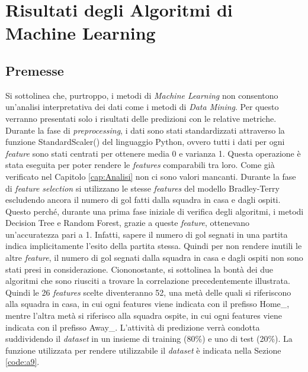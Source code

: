\chapter{Risultati degli Algoritmi di Machine Learning}
\label{cap:RisML}

\section{Premesse}
Si sottolinea che, purtroppo, i metodi di \emph{Machine Learning} non consentono un'analisi interpretativa dei dati come i metodi di \emph{Data Mining}. Per questo verranno presentati solo i risultati delle predizioni con le relative metriche.\\
Durante la fase di \emph{preprocessing}, i dati sono stati standardizzati attraverso la funzione \textsf{StandardScaler()} del linguaggio Python, ovvero tutti i dati per ogni \emph{feature} sono stati centrati per ottenere media 0 e varianza 1. Questa operazione è stata eseguita per poter rendere le \emph{features} comparabili tra loro. Come già verificato nel Capitolo \ref{cap:Analisi} non ci sono valori mancanti. Durante la fase di \emph{feature selection} si utilizzano le stesse \emph{features} del modello Bradley-Terry escludendo ancora il numero di gol fatti dalla squadra in casa e dagli ospiti. Questo perché, durante una prima fase iniziale di verifica degli algoritmi, i metodi Decision Tree e Random Forest, grazie a queste \emph{feature}, ottenevano un’accuratezza pari a 1. Infatti, sapere il numero di gol segnati in una partita indica implicitamente l'esito della partita stessa. Quindi per non rendere inutili le altre \emph{feature}, il numero di gol segnati dalla squadra in casa e dagli ospiti non sono stati presi in considerazione. Ciononostante, si sottolinea la bontà dei due algoritmi che sono riusciti a trovare la correlazione precedentemente illustrata. Quindi le 26 \emph{features} scelte diventeranno 52, una metà delle quali si riferiscono alla squadra in casa, in cui ogni features viene indicata con il prefisso \textsf{Home\_}, mentre l'altra metà si riferisco alla squadra ospite, in cui ogni features viene indicata con il prefisso \textsf{Away\_}. L'attività di predizione verrà condotta suddividendo il \emph{dataset} in un insieme di training (80\%) e uno di test (20\%). La funzione utilizzata per rendere utilizzabile il \emph{dataset} è indicata nella Sezione \ref{code:a9}.

